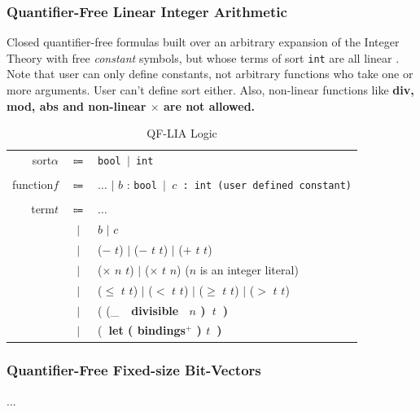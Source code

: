 \documentclass[10pt,letter]{article}
\theoremstyle{definition}
\begin{document}
\subsubsection{Quantifier-Free Linear Integer Arithmetic}
Closed quantifier-free formulas built over an arbitrary expansion of the
Integer Theory with free {\it constant} symbols, but whose terms of sort {\tt int}
are all linear \cite{bs2010}. Note that user can only define constants, not arbitrary functions who take one or more arguments. User can't define sort either. Also, non-linear functions like \bf div\rm, \bf mod\rm, \bf abs \rm and non-linear $\times$ are not allowed.

\begin{table}[!h]
\begin{mdframed}
\centering
\begin{tabular}{r c l}
sort\qquad $\alpha$ & $\Coloneqq$ & \tt bool $\mid$ int\\
\\
function\qquad $f$ & $\Coloneqq$ & $\ldots$ $\mid$ \rm $b$ : \tt bool $\mid$ \rm $c$ : \tt int \qquad(\rm user defined constant)\\
\\
term\qquad $t$ & $\Coloneqq$ & $\ldots$ \\
& $\mid$ & $b$ $\mid$ $c$\\
& $\mid$ & ($-$ $t$) $\mid$ ($-$ $t$ $t$) $\mid$ ($+$ $t$ $t$) \\
& $\mid$ & ($\times$ $n$ $t$) $\mid$ ($\times$ $t$ $n$) \qquad($n$ is an integer literal)\\
& $\mid$ & ($\leqslant$ $t$ $t$) $\mid$ ($<$ $t$ $t$) $\mid$ ($\geqslant$ $t$ $t$) $\mid$ ($>$ $t$ $t$)\\
& $\mid$ & ( (_\ \bf\ divisible \rm\ $n$ )\ $t$\ )\\
& $\mid$ & (\bf\ let \rm ( bindings$^+$ ) $t$\ )\\
\end{tabular}
\end{mdframed}
\caption{QF-LIA Logic}
\end{table}

\subsubsection{Quantifier-Free Fixed-size Bit-Vectors}
...
\end{document}
